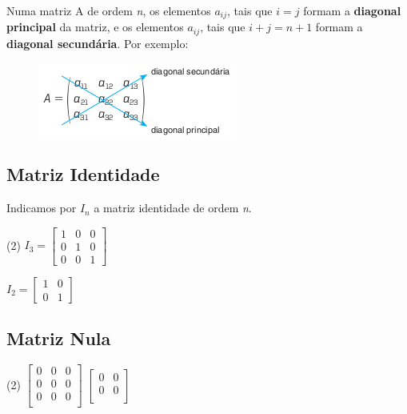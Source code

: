 Numa matriz A de ordem \textit{n}, os elementos $a_{ij}$, tais que $i = j$ formam a \textbf{diagonal principal} da matriz, e os elementos
$a_{ij}$, tais que $i + j = n + 1$ formam a \textbf{diagonal secundária}. Por exemplo:

\begin{figure}[htb!]
	\centering
	\includegraphics[width=.3\linewidth]{images/quadrada.png}
\end{figure}

\subsection{Matriz Identidade}


Indicamos por $I_n$ a matriz identidade de ordem \textit{n}.

\begin{examples}\leavevmode
	\begin{tasks}(2)
		\task $I_3 = \begin{bmatrix}
				1 & 0 & 0 \\
				0 & 1 & 0 \\
				0 & 0 & 1
			\end{bmatrix}$

		\task $I_2 = \begin{bmatrix}
				1 & 0 \\
				0 & 1
			\end{bmatrix}$
	\end{tasks}
\end{examples}

\subsection{Matriz Nula}


\begin{examples}\leavevmode
	\begin{tasks}(2)
		\task
		$\begin{bmatrix}
				0 & 0 & 0 \\
				0 & 0 & 0 \\
				0 & 0 & 0 \\
			\end{bmatrix}$
		\task $\begin{bmatrix}
				0 & 0 \\
				0 & 0 \\
			\end{bmatrix}$
	\end{tasks}

\end{examples}

